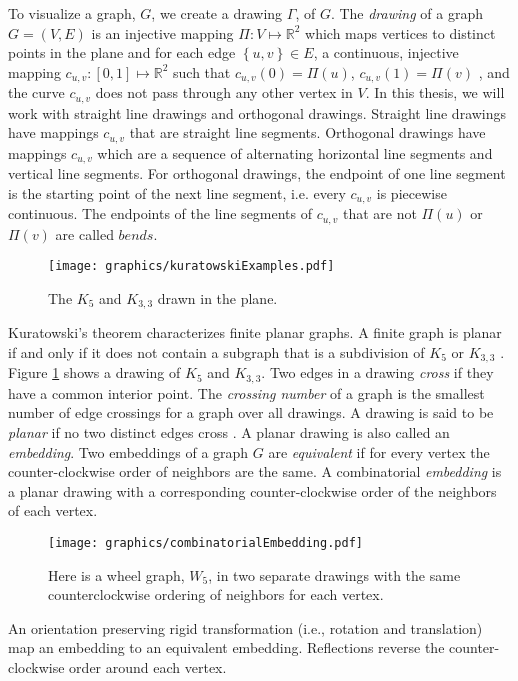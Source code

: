 \documentclass[10pt]{CSUNthesis}
\theoremstyle{plain}%
\theoremstyle{definition}
\theoremstyle{remark}
\newcommand{\bbR}{{\mathbb{R}}}
\newcommand{\curlybraces}[1]{\left\lbrace #1 \right\rbrace}
\begin{document}
To visualize a graph, $G$, we create a drawing $\Gamma$, of $G$.  
The \textit{drawing} of a graph $G=(V,E)$ is an injective mapping $\Pi : V \mapsto \bbR^{2}$ which maps vertices to distinct points in the plane and for each edge $\curlybraces{u,v} \in E$, a continuous, injective mapping $c_{u,v}:[0,1]\mapsto \bbR^2$ such that $c_{u,v}(0) = \Pi(u)$, $c_{u,v}(1) = \Pi(v)$ , and the curve $c_{u,v}$ does not pass through any other vertex in $V$.
In this thesis, we will work with straight line drawings and orthogonal drawings.
Straight line drawings have mappings $c_{u,v}$ that are straight line segments.
Orthogonal drawings have mappings $c_{u,v}$ which are a sequence of alternating horizontal line segments and vertical line segments.
For orthogonal drawings, the endpoint of one line segment is the starting point of the next line segment, i.e. every $c_{u,v}$ is piecewise continuous.
The endpoints of the line segments of $c_{u,v}$ that are not $\Pi(u)$ or $\Pi(v)$ are called $\textit{bends}$.

\begin{figure}[!htbp]
\begin{center}
\texttt{[image: graphics/kuratowskiExamples.pdf]}
\caption{The $K_5$ and $K_{3,3}$ drawn in the plane.}\label{fig:kuratowskiExamples.pdf}
\end{center} 
\end{figure} 
Kuratowski's theorem characterizes finite planar graphs.
A finite graph is planar if and only if it does not contain a subgraph that is a subdivision of $K_5$ or $K_{3,3}$ \cite{kuratowski1930probleme}. 
Figure \ref{fig:kuratowskiExamples.pdf} shows a drawing of $K_5$ and $K_{3,3}$.
Two edges in a drawing \textit{cross} if they have a common interior point.  
The \textit{crossing number} of a graph is the smallest number of edge crossings for a graph over all drawings.
A drawing is said to be \textit{planar} if no two distinct edges cross \cite{BET+99}.
A planar drawing is also called an \textit{embedding}.
Two embeddings of a graph $G$ are \textit{equivalent} if for every vertex the counter-clockwise order of neighbors are the same.%
A combinatorial \textit{embedding} is a planar drawing with a corresponding counter-clockwise order of the neighbors of each vertex. 
\begin{figure}[!htbp]
\begin{center}
    \texttt{[image: graphics/combinatorialEmbedding.pdf]}
    \caption{Here is a wheel graph, $W_5$, in two separate drawings with the same counterclockwise ordering of neighbors for each vertex.}\label{fig:combinatorialEmbedding.pdf}
\end{center}
\end{figure}
An orientation preserving rigid transformation (i.e., rotation and translation) map an embedding to an equivalent embedding.  
Reflections reverse the counter-clockwise order around each vertex.
\end{document}
